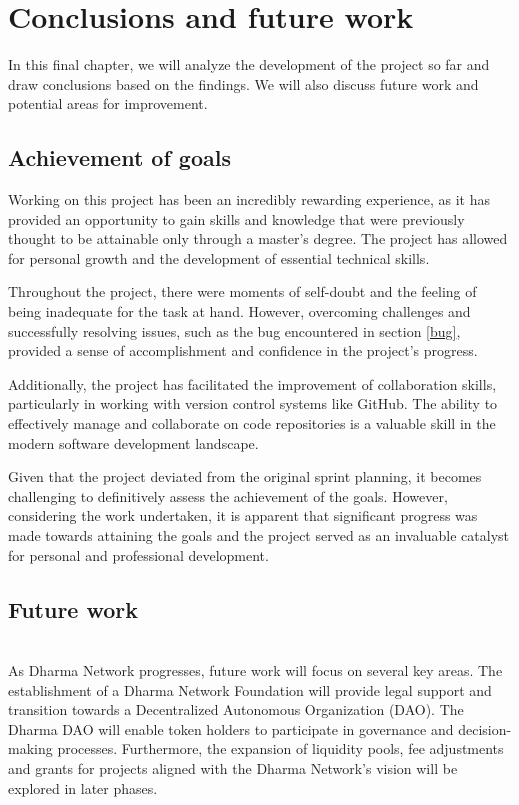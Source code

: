 \chapter{Conclusions and future work} \label{chap:chap6}

In this final chapter, we will analyze the development of the project so far and draw conclusions based on the findings. We will also discuss future work and potential areas for improvement.

\section{Achievement of goals}

Working on this project has been an incredibly rewarding experience, as it has provided an opportunity to gain skills and knowledge that were previously thought to be attainable only through a master's degree. The project has allowed for personal growth and the development of essential technical skills.\newline

Throughout the project, there were moments of self-doubt and the feeling of being inadequate for the task at hand. However, overcoming challenges and successfully resolving issues, such as the bug encountered in section \ref{bug}, provided a sense of accomplishment and confidence in the project's progress.\newline

Additionally, the project has facilitated the improvement of collaboration skills, particularly in working with version control systems like GitHub. The ability to effectively manage and collaborate on code repositories is a valuable skill in the modern software development landscape.\newline

Given that the project deviated from the original sprint planning, it becomes challenging to definitively assess the achievement of the goals. However, considering the work undertaken, it is apparent that significant progress was made towards attaining the goals and the project served as an invaluable catalyst for personal and professional development.\newline

\section{Future work}

\\As Dharma Network progresses, future work will focus on several key areas. The establishment of a Dharma Network Foundation will provide legal support and transition towards a Decentralized Autonomous Organization (DAO). The Dharma DAO will enable token holders to participate in governance and decision-making processes. Furthermore, the expansion of liquidity pools, fee adjustments and grants for projects aligned with the Dharma Network's vision will be explored in later phases.\\

